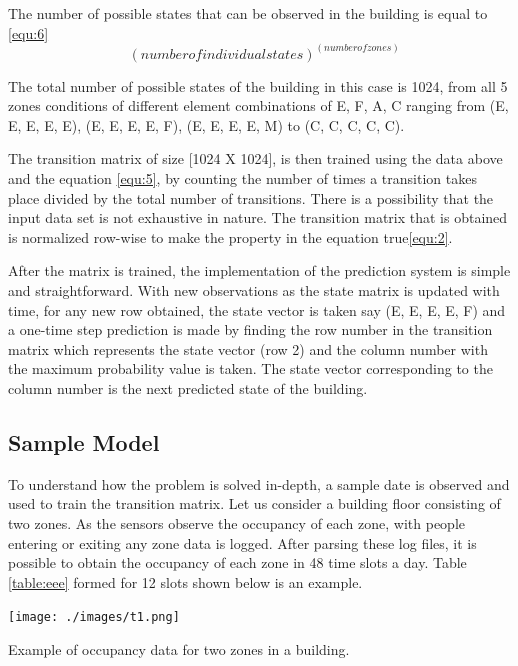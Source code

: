 The number of possible states that can be observed in the building is equal to \ref{equ:6}
\begin{equation}
\label{equ:6}
\text{ ${(number of individual states)}^{(number of zones)}$}
\end{equation}

The total number of possible states of the building in this case is 1024,  from all 5 zones conditions of different element combinations of {E, F, A, C} ranging from {(E, E, E, E, E)}, {(E, E, E, E, F)}, {(E, E, E, E, M)} to {(C, C, C, C, C)}.

The transition matrix of size  [1024 X 1024], is then trained using the data above and the equation \ref{equ:5}, by counting the number of times a transition takes place divided by the total number of transitions.  There is a possibility that the input data set is not exhaustive in nature.  The transition matrix that is obtained is normalized row-wise to make the property in the equation true\ref{equ:2}.

After the matrix is trained, the implementation of the prediction system is simple and straightforward.  With new observations as the state matrix is updated with time, for any new row obtained, the state vector is taken say ({E, E, E, E, F}) and a one-time step prediction is made by finding the row number in the transition matrix which represents the state vector (row 2) and the column number with the maximum probability value is taken.  The state vector corresponding to the column number is the next predicted state of the building.

\subsection{Sample Model}

To understand how the problem is solved in-depth,  a sample date is observed and used to train the transition matrix. Let us consider a building floor consisting of two zones.  As the sensors observe the occupancy of each zone, with people entering or exiting any zone data is logged.  After parsing these log files, it is possible to obtain the occupancy of each zone in 48 time slots a day.   Table \ref{table:eee} formed for 12 slots  shown below is an example.
\begin{table}[!ht]
  \centering
      \texttt{[image: ./images/t1.png]}
  \caption{Example of occupancy data for two zones in a building.}\label{table:eee}
\end{table}

